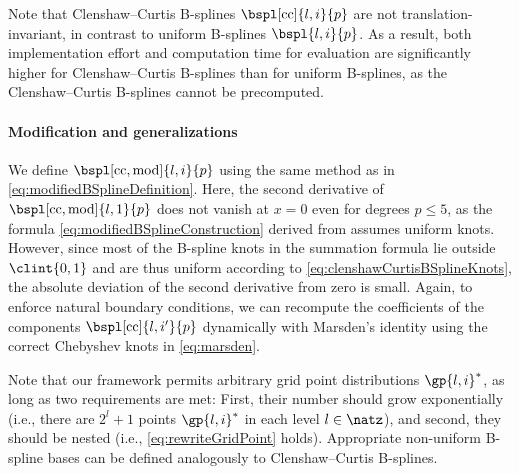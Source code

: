 Note that Clenshaw--Curtis B-splines
$\bspl[\cc]{l,i}{p}$ are not translation-invariant,
in contrast to uniform B-splines $\bspl{l,i}{p}$.
As a result, both implementation effort and computation time for evaluation
are significantly higher for Clenshaw--Curtis B-splines than
for uniform B-splines,
as the Clenshaw--Curtis B-splines cannot be precomputed.

\paragraph{Modification and generalizations}

We define 
$\bspl[\cc,\modified]{l,i}{p}$ using the
same method as in \cref{eq:modifiedBSplineDefinition}.
Here, the second derivative of $\bspl[\cc,\modified]{l,1}{p}$
does not vanish at $x = 0$ even for degrees $p \le 5$,
as the formula \eqref{eq:modifiedBSplineConstruction}
derived from  assumes uniform knots.
However, since most of the B-spline knots in the summation formula
lie outside $\clint{0, 1}$ and are thus uniform according
to \cref{eq:clenshawCurtisBSplineKnots},
the absolute deviation of the second derivative from zero is small.
Again, to enforce natural boundary conditions,
we can recompute the coefficients
of the components $\bspl[\cc]{l,i'}{p}$
dynamically with Marsden's identity using the correct Chebyshev knots
in \cref{eq:marsden}.

Note that our framework permits arbitrary grid point distributions
$\gp{l,i}^\ast$,
as long as two requirements are met:
First, their number should grow exponentially
(i.e., there are $2^l + 1$ points $\gp{l,i}^\ast$ in each level $l \in \natz$),
and second, they should be nested
(i.e., \cref{eq:rewriteGridPoint} holds).
Appropriate non-uniform B-spline bases can be defined analogously
to Clenshaw--Curtis B-splines.
